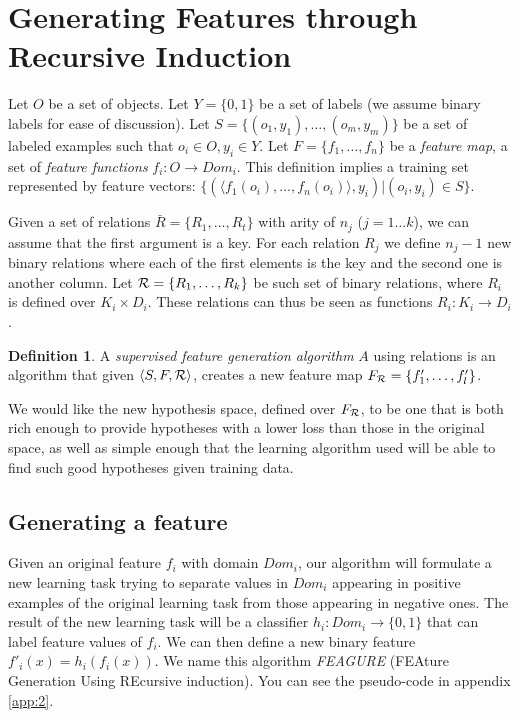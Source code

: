\documentclass{article}
\theoremstyle{definition}
\newtheorem{defn}{Definition}[section]
\begin{document}
\section{Generating Features through Recursive Induction}

Let $O$ be a set of objects. Let $Y=\{0,1\}$ be a set of labels (we assume binary labels for ease of discussion). Let $S=\{(o_{1},y_{1}),\ldots,(o_{m},y_{m})\}$ be a set of labeled examples such that $o_{i}\in O, y_{i}\in Y$. Let $F=\{f_{1},\ldots,f_{n}\}$ be a \emph{feature map}, a set of \emph{feature functions} $f_{i}:O\rightarrow Dom_{i}$.  This definition implies a training set represented by feature vectors: $\{ (\langle f_1(o_i),\ldots,f_n(o_i)\rangle, y_i) | (o_i,y_i) \in S\}$.

Given a set of relations $\bar{R}=\{R_{1},\ldots,R_{t}\}$ with arity of $n_{j}$ ($j=1\ldots k$), we can assume  that the first argument is a key. For each relation $R_{j}$ we define $n_{j}-1$ new binary relations where each of the first elements is the key and the second one is another column.
Let ${\cal R}=\{R_{1},\ldots,R_{k}\}$ be such set of binary relations, where $R_{i}$ is defined over $K_{i}\times D_{i}$. These relations can thus be seen as functions $R_{i}: K_{i}\rightarrow D_{i}$.

\begin{defn}
	A \emph{supervised feature generation algorithm} $A$ using relations is an algorithm that given $\langle S,F,{\cal R} \rangle$, creates a new feature map $F_{\cal R}=\{f'_{1},\ldots,f'_{l}\}$.
\end{defn}

We would like the new hypothesis space, defined over $F_{\cal R}$, to be one that is both rich enough to provide hypotheses with a lower loss than those in the original space, as well as simple enough that the learning algorithm used will be able to find such good hypotheses given training data.

\subsection{Generating a feature} \label{algorithm_section}

Given an original feature $f_{i}$ with domain $Dom_i$, our algorithm will formulate a new learning task trying to separate values in $Dom_i$ appearing in positive examples of the original learning task from those appearing in negative ones.  The result of the new learning task will be a classifier
$h_{i}:Dom_{i}\rightarrow \{0,1\}$ that can label feature values of $f_{i}$. We can then define a new binary feature $f'_{i}(x)=h_{i}(f_{i}(x))$.
We name this algorithm \emph{FEAGURE} (FEAture Generation Using REcursive induction). You can see the pseudo-code in appendix \ref{app:2}.
\end{document}
